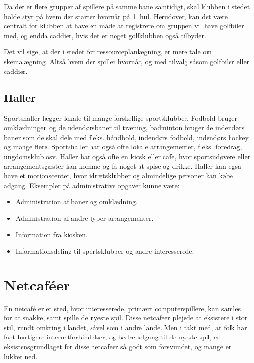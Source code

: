Da der er flere grupper af spillere på samme bane samtidigt, skal klubben i stedet holde styr på hvem der starter hvornår på 1. hul. Herudover, kan det være centralt for klubben at have en måde at registrere om gruppen vil have golfbiler med, og endda caddier, hvis det er noget golfklubben også tilbyder.

Det vil sige, at der i stedet for ressourceplanlægning, er mere tale om skemalægning. Altså hvem der spiller hvornår, og med tilvalg såsom golfbiler eller caddier.


\subsection{Haller}

Sportshaller lægger lokale til mange forskellige sportsklubber. Fodbold bruger omklædningen og de udendørsbaner til træning, badminton bruger de indendørs baner som de skal dele med f.eks. håndbold, indendørs fodbold, indendørs hockey og mange flere. Sportshaller har også ofte lokale arrangementer, f.eks. foredrag, ungdomsklub osv. 
Haller har også ofte en kiosk eller cafe, hvor sportsudøvere eller arrangementsgæster kan komme og få noget at spise og drikke. 
Haller kan også have et motionscenter, hvor idrætsklubber og almindelige personer kan købe adgang. 
Eksempler på administrative opgaver kunne være:

\begin{itemize}
\item Administration af baner og omklædning.
\item Administration af andre typer arrangementer.
\item Information fra kiosken.
\item Informationsdeling til sportsklubber og andre interesserede.
\end{itemize}


\section{Netcaféer}\label{chap:netcafeer}

En netcafé er et sted, hvor interesserede, primært computerspillere, kan samles for at snakke, samt spille de
nyeste spil. Disse netcafeer plejede at eksistere i stor stil, rundt omkring i landet, såvel som i andre
lande. Men i takt med, at folk har fået hurtigere internetforbindelser, og bedre adgang til de nyeste spil, er
eksistensgrundlaget for disse netcafeer så godt som forsvundet, og mange er lukket ned.

